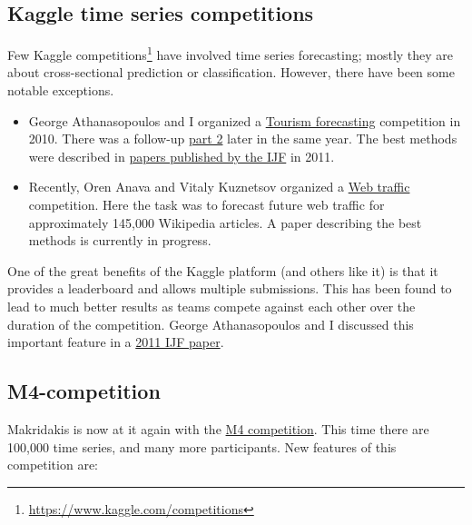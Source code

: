 \documentclass[11pt,a4paper,]{article}
\begin{document}
\hypertarget{kaggle-time-series-competitions}{%
\subsection*{Kaggle time series competitions}\label{kaggle-time-series-competitions}}

Few Kaggle competitions\footnote{\url{https://www.kaggle.com/competitions}} have involved time series forecasting; mostly they are about cross-sectional prediction or classification. However, there have been some notable exceptions.

\begin{itemize}
\item
  George Athanasopoulos and I organized a \href{https://www.kaggle.com/c/tourism1}{Tourism forecasting} competition in 2010. There was a follow-up \href{https://www.kaggle.com/c/tourism2}{part 2} later in the same year. The best methods were described in \href{https://www.sciencedirect.com/journal/international-journal-of-forecasting/vol/27/issue/3}{papers published by the IJF} in 2011.
\item
  Recently, Oren Anava and Vitaly Kuznetsov organized a \href{https://www.kaggle.com/c/web-traffic-time-series-forecasting}{Web traffic} competition. Here the task was to forecast future web traffic for approximately 145,000 Wikipedia articles. A paper describing the best methods is currently in progress.
\end{itemize}

One of the great benefits of the Kaggle platform (and others like it) is that it provides a leaderboard and allows multiple submissions. This has been found to lead to much better results as teams compete against each other over the duration of the competition. George Athanasopoulos and I discussed this important feature in a \href{/publications/kaggle/}{2011 IJF paper}.

\hypertarget{m4-competition}{%
\subsection*{M4-competition}\label{m4-competition}}

Makridakis is now at it again with the \href{https://www.m4.unic.ac.cy/}{M4 competition}. This time there are 100,000 time series, and many more participants. New features of this competition are:
\end{document}

